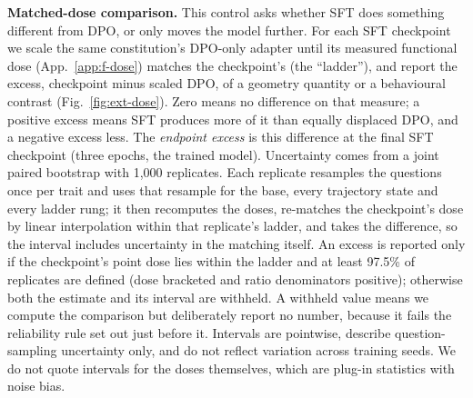 \documentclass{article}
\begin{document}
\noindent\textbf{Matched-dose comparison.} This control asks whether SFT does something different from DPO, or only moves the model further. For each SFT checkpoint we scale the same constitution's DPO-only adapter until its measured functional dose (App.~\ref{app:f-dose}) matches the checkpoint's (the ``ladder''), and report the excess, checkpoint minus scaled DPO, of a geometry quantity or a behavioural contrast (Fig.~\ref{fig:ext-dose}). Zero means no difference on that measure; a positive excess means SFT produces more of it than equally displaced DPO, and a negative excess less. The \emph{endpoint excess} is this difference at the final SFT checkpoint (three epochs, the trained model). Uncertainty comes from a joint paired bootstrap with 1{,}000 replicates. Each replicate resamples the questions once per trait and uses that resample for the base, every trajectory state and every ladder rung; it then recomputes the doses, re-matches the checkpoint's dose by linear interpolation within that replicate's ladder, and takes the difference, so the interval includes uncertainty in the matching itself. An excess is reported only if the checkpoint's point dose lies within the ladder and at least 97.5\% of replicates are defined (dose bracketed and ratio denominators positive); otherwise both the estimate and its interval are withheld. A withheld value means we compute the comparison but deliberately report no number, because it fails the reliability rule set out just before it. Intervals are pointwise, describe question-sampling uncertainty only, and do not reflect variation across training seeds. We do not quote intervals for the doses themselves, which are plug-in statistics with noise bias.
\end{document}
